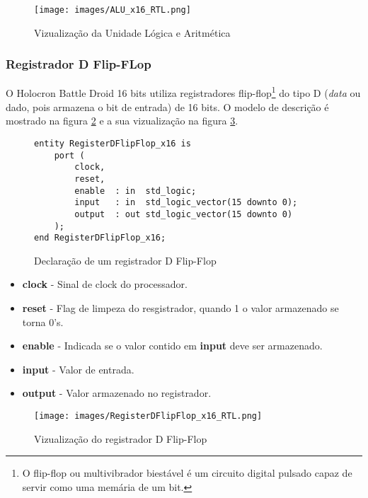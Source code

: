 \documentclass{article}
\newcommand\tab[1][0.50cm]{\hspace*{#1}}
\begin{document}
				\begin{figure}[H]
					\centering
					\caption[Vizualiza\c{c}\~{a}o da ULA]{Vizualiza\c{c}\~{a}o da Unidade L\'{o}gica e Aritm\'{e}tica}
					\label{fig:ALU_2x16_RTL}
					\texttt{[image: images/ALU\_x16\_RTL.png]}
				\end{figure}
			\subsubsection[Registrador D Flip-Flop]{Registrador D Flip-FLop}
				\tab O Holocron Battle Droid 16 bits utiliza registradores flip-flop\footnote{O flip-flop ou multivibrador biest\'{a}vel \'{e} um circuito digital pulsado capaz de servir como uma mem\'{a}ria de um bit.} do tipo D (\textit{data} ou dado, pois armazena o bit de entrada) de 16 bits. O modelo de descri\c{c}\~{a}o \'{e} mostrado na figura \ref{fig:RegisterDFlipFlop_x16} e a sua vizualiza\c{c}\~{a}o na figura \ref{fig:RegisterDFlipFlop_x16_RTL}.
				\begin{figure}[H]
					\centering
					\caption[Registrador D Flip-Flop]{Declara\c{c}\~{a}o de um registrador D Flip-Flop}
					\label{fig:RegisterDFlipFlop_x16}
					\begin{lstlisting}[style=vhdl]
entity RegisterDFlipFlop_x16 is 
	port (
		clock, 
		reset, 
		enable	: in  std_logic;
		input	: in  std_logic_vector(15 downto 0);
		output	: out std_logic_vector(15 downto 0)
	);
end RegisterDFlipFlop_x16;
					\end{lstlisting}
				\end{figure}
				\begin{itemize}
					\item \textbf{clock} - Sinal de clock do processador.
					\item \textbf{reset} - Flag de limpeza do resgistrador, quando 1 o valor armazenado se torna 0's.
					\item \textbf{enable} - Indicada se o valor contido em \textbf{input} deve ser armazenado.
					\item \textbf{input} - Valor de entrada.
					\item \textbf{output} - Valor armazenado no registrador.
				\end{itemize}
				\begin{figure}[H]
					\centering
					\caption[Vizualiza\c{c}\~{a}o do registrador D Flip-Flop]{Vizualiza\c{c}\~{a}o do registrador D Flip-Flop}
					\label{fig:RegisterDFlipFlop_x16_RTL}
					\texttt{[image: images/RegisterDFlipFlop\_x16\_RTL.png]}
				\end{figure}
\end{document}

